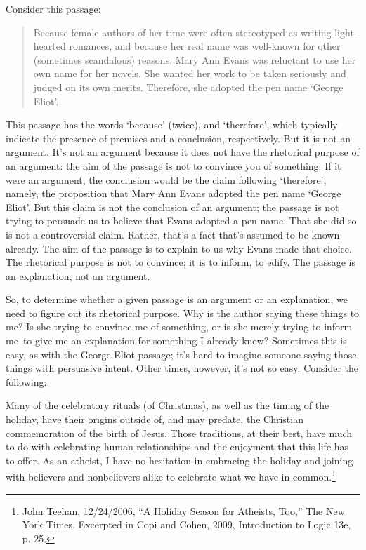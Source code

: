 Consider this passage:

\begin{quote}
Because female authors of her time were often stereotyped as writing light-hearted
romances, and because her real name was well-known for other (sometimes scandalous)
reasons, Mary Ann Evans was reluctant to use her own name for her novels. She wanted
her work to be taken seriously and judged on its own merits. Therefore, she adopted the
pen name `George Eliot'.
\end{quote}

This passage has the words `because' (twice), and `therefore', which typically indicate the
presence of premises and a conclusion, respectively. But it is not an argument. It's not an argument
because it does not have the rhetorical purpose of an argument: the aim of the passage is not to
convince you of something. If it were an argument, the conclusion would be the claim following
`therefore', namely, the proposition that Mary Ann Evans adopted the pen name `George Eliot'.
But this claim is not the conclusion of an argument; the passage is not trying to persuade us to
believe that Evans adopted a pen name. That she did so is not a controversial claim. Rather, that's
a fact that's assumed to be known already. The aim of the passage is to explain to us why Evans
made that choice. The rhetorical purpose is not to convince; it is to inform, to edify. The passage
is an explanation, not an argument.

So, to determine whether a given passage is an argument or an explanation, we need to figure out
its rhetorical purpose. Why is the author saying these things to me? Is she trying to convince me
of something, or is she merely trying to inform me--to give me an explanation for something I
already knew? Sometimes this is easy, as with the George Eliot passage; it's hard to imagine
someone saying those things with persuasive intent. Other times, however, it's not so easy.
Consider the following:

Many of the celebratory rituals (of Christmas), as well as the timing of the holiday, have
their origins outside of, and may predate, the Christian commemoration of the birth of
Jesus. Those traditions, at their best, have much to do with celebrating human relationships
and the enjoyment that this life has to offer. As an atheist, I have no hesitation in embracing
the holiday and joining with believers and nonbelievers alike to celebrate what we have in
common.\footnote{John Teehan, 12/24/2006, ``A Holiday Season for Atheists, Too,'' The New York 
Times. Excerpted in Copi and Cohen,
2009, Introduction to Logic 13e, p. 25.}

